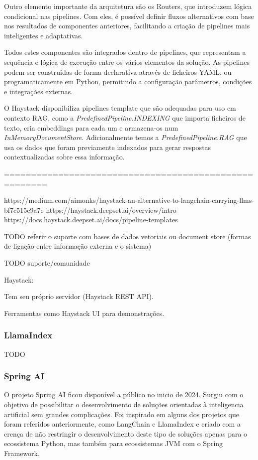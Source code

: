 Outro elemento importante da arquitetura são os Routers, que introduzem lógica condicional nas pipelines. Com eles, é possível definir fluxos alternativos com base nos resultados de componentes anteriores, facilitando a criação de pipelines mais inteligentes e adaptativas.

Todos estes componentes são integrados dentro de pipelines, que representam a sequência e lógica de execução entre os vários elementos da solução. As pipelines podem ser construidas de forma declarativa através de ficheiros YAML, ou programaticamente em Python, permitindo a configuração parâmetros, condições e integrações externas. 

O Haystack disponibiliza pipelines template que são adequadas para uso em contexto RAG, como a \textit{PredefinedPipeline.INDEXING} que importa ficheiros de texto, cria embeddings para cada um e armazena-os num \textit{InMemoryDocumentStore}. Adicionalmente temos a \textit{PredefinedPipeline.RAG} que usa os dados que foram previamente indexados para gerar respostas contextualizadas sobre essa informação. 



======================================================

https://medium.com/aimonks/haystack-an-alternative-to-langchain-carrying-llms-bf7c515c9a7e
https://haystack.deepset.ai/overview/intro
https://docs.haystack.deepset.ai/docs/pipeline-templates


TODO referir o suporte com bases de dados vetoriais ou document store (formas de ligação entre informação externa e o sistema)

TODO suporte/comunidade


Haystack:

Tem seu próprio servidor (Haystack REST API).

Ferramentas como Haystack UI para demonstrações.




\subsubsection{LlamaIndex}

TODO



\subsubsection{Spring AI}


O projeto Spring AI ficou disponível a público no inicio de 2024. Surgiu com o objetivo de possibilitar o desenvolvimento de soluções orientadas à inteligencia artificial sem grandes complicações. Foi inspirado em alguns dos projetos que foram referidos anteriormente, como LangChain e LlamaIndex e criado com a crença de não restringir o desenvolvimento deste tipo de soluções apenas para o ecossistema Python, mas também para ecossistemas JVM com o Spring Framework.

